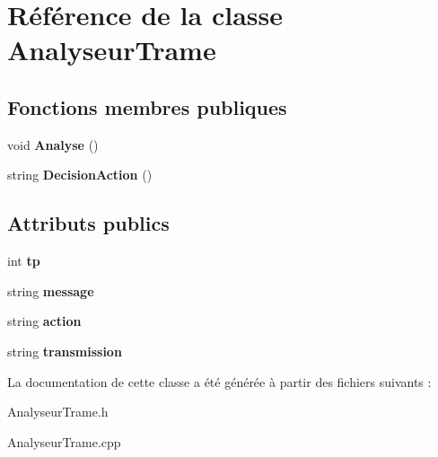\hypertarget{class_analyseur_trame}{\section{Référence de la classe Analyseur\-Trame}
\label{class_analyseur_trame}
}
\subsection*{Fonctions membres publiques}
\begin{DoxyCompactItemize}
\item 
\hypertarget{class_analyseur_trame_a8236101e93db0b93abc848315bb12fbe}{void {\bfseries Analyse} ()}\label{class_analyseur_trame_a8236101e93db0b93abc848315bb12fbe}

\item 
\hypertarget{class_analyseur_trame_a9ee7cc0d9acef398628fdbfbdd161420}{string {\bfseries Decision\-Action} ()}\label{class_analyseur_trame_a9ee7cc0d9acef398628fdbfbdd161420}

\end{DoxyCompactItemize}
\subsection*{Attributs publics}
\begin{DoxyCompactItemize}
\item 
\hypertarget{class_analyseur_trame_a92ecc1f6adb0d26bf21e7e6575107a74}{int {\bfseries tp}}\label{class_analyseur_trame_a92ecc1f6adb0d26bf21e7e6575107a74}

\item 
\hypertarget{class_analyseur_trame_ace662efeeda426d04365efa4e8618d9a}{string {\bfseries message}}\label{class_analyseur_trame_ace662efeeda426d04365efa4e8618d9a}

\item 
\hypertarget{class_analyseur_trame_a82fca98128bc8353d4859e2a6f5c9b45}{string {\bfseries action}}\label{class_analyseur_trame_a82fca98128bc8353d4859e2a6f5c9b45}

\item 
\hypertarget{class_analyseur_trame_a047e28d9030a06ff379c7febb63432aa}{string {\bfseries transmission}}\label{class_analyseur_trame_a047e28d9030a06ff379c7febb63432aa}

\end{DoxyCompactItemize}


La documentation de cette classe a été générée à partir des fichiers suivants \-:\begin{DoxyCompactItemize}
\item 
Analyseur\-Trame.\-h\item 
Analyseur\-Trame.\-cpp\end{DoxyCompactItemize}
